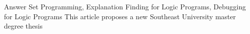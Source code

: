 
\begin{abstract}{回答集程序，逻辑程序解释发现，逻辑程序调试}
本文提出了一个新的东南大学
\end{abstract}

\begin{englishabstract}{Answer Set Programming, Explanation Finding for Logic Programs, Debugging for Logic Programs}
This article proposes a new Southeast University master degree thesis
\end{englishabstract}
